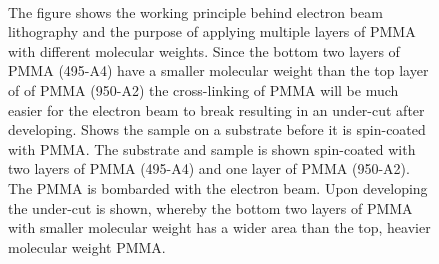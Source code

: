 \begin{figure}[ht]
    \centering
    \\
    \caption[Electron beam lithography steps and working principle]{
        The figure shows the working principle behind electron beam lithography and the purpose of applying multiple layers of \acs{PMMA} with different molecular weights. Since the bottom two layers 
        of \acs{PMMA} (495-A4) have a smaller molecular weight than the top layer of of \acs{PMMA} (950-A2) the cross-linking of \acs{PMMA} will be much easier for the electron beam
        to break resulting in an under-cut after developing.
        \protect{} Shows the sample on a  substrate before it is spin-coated with \acs{PMMA}. 
        \protect{} The substrate and sample is shown spin-coated with two layers of \acs{PMMA} (495-A4) and one layer of \acs{PMMA} (950-A2).
        \protect{} The \acs{PMMA} is bombarded with the electron beam.
        \protect{} Upon developing the under-cut is shown, whereby the bottom two layers of \acs{PMMA} with smaller molecular weight has a wider area than the top, heavier molecular weight \acs{PMMA}.
    }
\end{figure}

